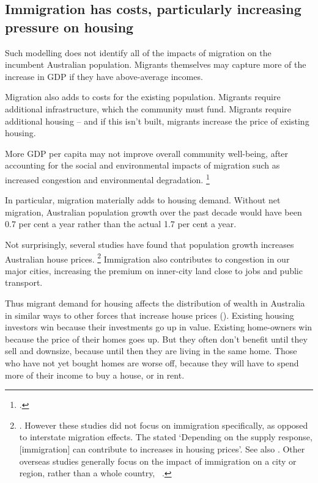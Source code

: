 \subsection{Immigration has costs, particularly increasing pressure on housing}\label{subsec:immigration-has-costs}

Such modelling does not identify all of the impacts of migration on the incumbent Australian population.
Migrants themselves may capture more of the increase in GDP if they have above-average incomes.

Migration also adds to costs for the existing population.
Migrants require additional infrastructure, which the community must fund.
Migrants require additional housing -- and if this isn't built, migrants increase the price of existing housing.

More GDP per capita may not improve overall community well-being, after accounting for the social and environmental impacts of migration such as increased congestion and environmental degradation.%
	\footcites[][16--17, 363]{CommissionMigrantIntake2016}{Sobels-2013-Crikey-Pop-v-environ}

In particular, migration materially adds to housing demand.
Without net migration, Australian population growth over the past decade would have been 0.7 per cent a year rather than the actual 1.7 per cent a year.

Not surprisingly, several studies have found that population growth increases Australian house prices.%
	\footnote{\textcites{BourassaHendershott-1995-Aust-capital-city-house-prices}{OttoGrowthofHousePrices}.
	However these studies did not focus on immigration specifically, as opposed to interstate migration effects.
	The \textcite[][227]{CommissionMigrantIntake2016} stated `Depending on the supply response, [immigration] can contribute to increases in housing prices'. See also \textcite{Andric2015immigration}.
	Other overseas studies generally focus on the impact of immigration on a city or region, rather than a whole country, \eg~\textcite{Saiz2007housepricesrents}.}
Immigration also contributes to congestion in our major cities, increasing the premium on inner-city land close to jobs and public transport.

Thus migrant demand for housing affects the distribution of wealth in Australia in similar ways to other forces that increase house prices ().
Existing housing investors win because their investments go up in value.
Existing home-owners win because the price of their homes goes up.
But they often don't benefit until they sell and downsize, because until then they are living in the same home.
Those who have not yet bought homes are worse off, because they will have to spend more of their income to buy a house, or in rent.

